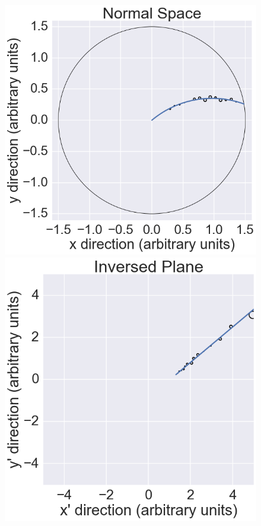 \begin{figure}
 \centering
 \includegraphics[scale=0.2]{figures/theory/legendre_1.png}
 \includegraphics[scale=0.2]{figures/theory/legendre_2.png}

\end{figure}
